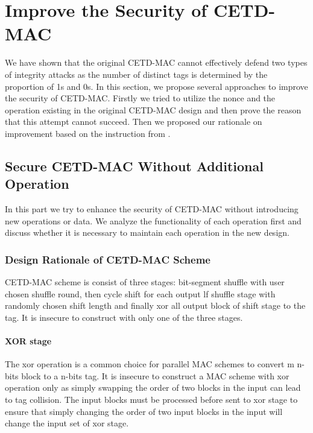 \section{Improve the Security of CETD-MAC}
We have shown that the original CETD-MAC cannot effectively defend two types of integrity attacks as the number of distinct tags is determined by the proportion of 1s and 0s. In this section, we propose several approaches to improve the security of CETD-MAC. Firstly we tried to utilize the nonce and the operation existing in the original CETD-MAC design and then prove the reason that this attempt cannot succeed. Then we proposed our rationale on improvement based on the instruction from \cite{aes1999}.  
\subsection{Secure CETD-MAC Without Additional Operation}\label{sect:pattern}
In this part we try to enhance the security of CETD-MAC without introducing new operations or data. We analyze the functionality of each operation first and discuss whether it is necessary to maintain each operation in the new design.
\subsubsection{Design Rationale of CETD-MAC Scheme}
CETD-MAC scheme is consist of three stages: bit-segment shuffle with user chosen shuffle round, then cycle shift for each output lf shuffle stage with randomly chosen shift length and finally xor all output block of shift stage to the tag. It is insecure to construct with only one of the three stages.
\paragraph{XOR stage}
The xor operation is a common choice for parallel MAC schemes to convert m n-bits block to a n-bits tag. It is insecure to construct a MAC scheme with xor operation only as simply swapping the order of two blocks in the input can lead to tag collision.  The input blocks must be processed before sent to xor stage to ensure that simply changing the order of two input blocks in the input will change the input set of xor stage.
